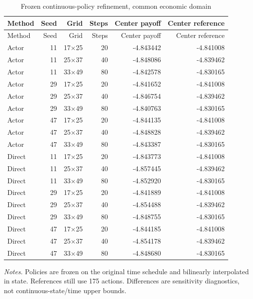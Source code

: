 \documentclass[ecta,nameyear,draft]{econsocart}
\theoremstyle{definition}
\theoremstyle{remark}
\begin{document}
\begin{small}
\begin{longtable}{lrrrrr}
\caption{Frozen continuous-policy refinement, common economic domain}\\
\toprule
Method & Seed & Grid & Steps & Center payoff & Center reference \\
\midrule\endfirsthead
\toprule
Method & Seed & Grid & Steps & Center payoff & Center reference \\
\midrule\endhead
Actor & 11 & 17$\times$25 & 20 & -4.843442 & -4.841008 \\
Actor & 11 & 25$\times$37 & 40 & -4.848086 & -4.839462 \\
Actor & 11 & 33$\times$49 & 80 & -4.842578 & -4.830165 \\
Actor & 29 & 17$\times$25 & 20 & -4.841652 & -4.841008 \\
Actor & 29 & 25$\times$37 & 40 & -4.846754 & -4.839462 \\
Actor & 29 & 33$\times$49 & 80 & -4.840763 & -4.830165 \\
Actor & 47 & 17$\times$25 & 20 & -4.844135 & -4.841008 \\
Actor & 47 & 25$\times$37 & 40 & -4.848828 & -4.839462 \\
Actor & 47 & 33$\times$49 & 80 & -4.843387 & -4.830165 \\
Direct & 11 & 17$\times$25 & 20 & -4.843773 & -4.841008 \\
Direct & 11 & 25$\times$37 & 40 & -4.857445 & -4.839462 \\
Direct & 11 & 33$\times$49 & 80 & -4.852920 & -4.830165 \\
Direct & 29 & 17$\times$25 & 20 & -4.841889 & -4.841008 \\
Direct & 29 & 25$\times$37 & 40 & -4.854488 & -4.839462 \\
Direct & 29 & 33$\times$49 & 80 & -4.848755 & -4.830165 \\
Direct & 47 & 17$\times$25 & 20 & -4.844185 & -4.841008 \\
Direct & 47 & 25$\times$37 & 40 & -4.854178 & -4.839462 \\
Direct & 47 & 33$\times$49 & 80 & -4.848680 & -4.830165 \\
\bottomrule\end{longtable}\end{small}
\noindent\textit{Notes.} Policies are frozen on the original time schedule and bilinearly interpolated in state. References still use 175 actions. Differences are sensitivity diagnostics, not continuous-state/time upper bounds.
\end{document}

